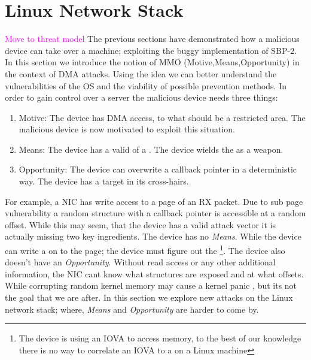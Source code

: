 \section{Linux Network Stack}
\textcolor{magenta}{Move to threat model}
The previous sections have demonstrated how a malicious device can take over a machine; exploiting the buggy implementation of SBP-2. In this section we introduce the notion of MMO (Motive,Means,Opportunity) in the context of DMA attacks. Using the idea we can better understand the vulnerabilities of the OS and the viability of possible prevention methods. In order to gain control over a server the malicious device needs three things:
\begin{enumerate}
    \item Motive: The device has DMA access, to what should be a restricted area. The malicious device is now motivated to exploit this situation. 
    \item Means: The device has a valid \kva of a \mabaf. The device wields the \kva as a weapon.
    \item Opportunity: The device can overwrite a callback pointer in a deterministic way. The device has a target in its cross-hairs.
\end{enumerate}
For example, a NIC has write access to a page of an RX packet. Due to sub page vulnerability a random structure with a callback pointer is accessible at a random offset. While this may seem, that the device has a valid attack vector it is actually missing two key ingredients. The device has no \textit{Means}. While the device can write a \mabaf on to the page; the device must figure out the \kva\footnote{The device is using an IOVA to access memory, to the best of our knowledge there is no way to correlate an IOVA to a \kva on a Linux machine}. The device also doesn't have an \textit{Opportunity}. Without  read access or any other additional information, the NIC cant know what structures are exposed and at what offsets. While corrupting random kernel memory may cause a kernel panic \cite{MMT16}, but its not the goal that we are after.\newline
In this section we explore new attacks on the Linux network stack; where, \textit{Means} and \textit{Opportunity} are harder to come by. 
